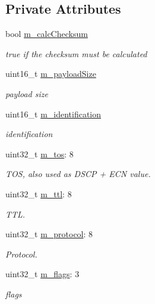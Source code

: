\subsection*{Private Attributes}
\begin{DoxyCompactItemize}
\item 
bool \hyperlink{classns3_1_1Ipv4Header_afe50955aeda795cbe640f6e8e1626626}{m\+\_\+calc\+Checksum}
\begin{DoxyCompactList}\small\item\em true if the checksum must be calculated \end{DoxyCompactList}\item 
uint16\+\_\+t \hyperlink{classns3_1_1Ipv4Header_a5d09939d73631fa3981ec4dfb6cc3481}{m\+\_\+payload\+Size}
\begin{DoxyCompactList}\small\item\em payload size \end{DoxyCompactList}\item 
uint16\+\_\+t \hyperlink{classns3_1_1Ipv4Header_a4cff3bd3c1fa0464a4f8940014e8fa5e}{m\+\_\+identification}
\begin{DoxyCompactList}\small\item\em identification \end{DoxyCompactList}\item 
uint32\+\_\+t \hyperlink{classns3_1_1Ipv4Header_a63a9a2088793d46323e2a2a5cce4260b}{m\+\_\+tos}\+: 8
\begin{DoxyCompactList}\small\item\em T\+OS, also used as D\+S\+CP + E\+CN value. \end{DoxyCompactList}\item 
uint32\+\_\+t \hyperlink{classns3_1_1Ipv4Header_a2c4861b795acda1a7d7f2e322afa2f96}{m\+\_\+ttl}\+: 8
\begin{DoxyCompactList}\small\item\em T\+TL. \end{DoxyCompactList}\item 
uint32\+\_\+t \hyperlink{classns3_1_1Ipv4Header_a2f5b8e55ff90bbcd93755a127fb0e2f1}{m\+\_\+protocol}\+: 8
\begin{DoxyCompactList}\small\item\em Protocol. \end{DoxyCompactList}\item 
uint32\+\_\+t \hyperlink{classns3_1_1Ipv4Header_ac43d5aa8e26e2d4cd4cf9520760f7638}{m\+\_\+flags}\+: 3
\begin{DoxyCompactList}\small\item\em flags \end{DoxyCompactList}\item 

\end{DoxyCompactItemize}
